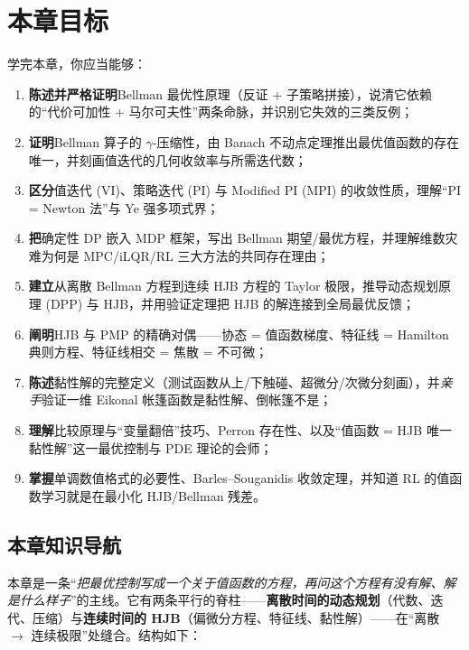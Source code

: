 \section*{本章目标}
学完本章，你应当能够：
\begin{enumerate}
  \item \textbf{陈述并严格证明}Bellman 最优性原理（反证 + 子策略拼接），说清它依赖的“代价可加性 + 马尔可夫性”两条命脉，并识别它失效的三类反例；
  \item \textbf{证明}Bellman 算子的 $\gamma$-压缩性，由 Banach 不动点定理推出最优值函数的存在唯一，并刻画值迭代的几何收敛率与所需迭代数；
  \item \textbf{区分}值迭代 (VI)、策略迭代 (PI) 与 Modified PI (MPI) 的收敛性质，理解“PI = Newton 法”与 Ye 强多项式界；
  \item \textbf{把}确定性 DP 嵌入 MDP 框架，写出 Bellman 期望/最优方程，并理解维数灾难为何是 MPC/iLQR/RL 三大方法的共同存在理由；
  \item \textbf{建立}从离散 Bellman 方程到连续 HJB 方程的 Taylor 极限，推导动态规划原理 (DPP) 与 HJB，并用验证定理把 HJB 的解连接到全局最优反馈；
  \item \textbf{阐明}HJB 与 PMP 的精确对偶——协态 = 值函数梯度、特征线 = Hamilton 典则方程、特征线相交 = 焦散 = 不可微；
  \item \textbf{陈述}黏性解的完整定义（测试函数从上/下触碰、超微分/次微分刻画），并\emph{亲手}验证一维 Eikonal 帐篷函数是黏性解、倒帐篷不是；
  \item \textbf{理解}比较原理与“变量翻倍”技巧、Perron 存在性、以及“值函数 = HJB 唯一黏性解”这一最优控制与 PDE 理论的会师；
  \item \textbf{掌握}单调数值格式的必要性、Barles--Souganidis 收敛定理，并知道 RL 的值函数学习就是在最小化 HJB/Bellman 残差。
\end{enumerate}

\subsection*{本章知识导航}
本章是一条“\emph{把最优控制写成一个关于值函数的方程，再问这个方程有没有解、解是什么样子}”的主线。它有两条平行的脊柱——\textbf{离散时间的动态规划}（代数、迭代、压缩）与\textbf{连续时间的 HJB}（偏微分方程、特征线、黏性解）——在“离散 $\to$ 连续极限”处缝合。结构如下：

